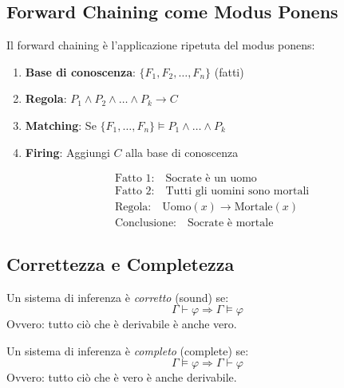 \subsection{Forward Chaining come Modus Ponens}

Il forward chaining è l'applicazione ripetuta del modus ponens:

\begin{enumerate}
\item \textbf{Base di conoscenza}: $\{F_1, F_2, \ldots, F_n\}$ (fatti)
\item \textbf{Regola}: $P_1 \land P_2 \land \ldots \land P_k \rightarrow C$
\item \textbf{Matching}: Se $\{F_1, \ldots, F_n\} \models P_1 \land \ldots \land P_k$
\item \textbf{Firing}: Aggiungi $C$ alla base di conoscenza
\end{enumerate}

\begin{esempio}
\begin{align*}
&\text{Fatto 1:} \quad \text{Socrate è un uomo} \\
&\text{Fatto 2:} \quad \text{Tutti gli uomini sono mortali} \\
&\text{Regola:} \quad \text{Uomo}(x) \rightarrow \text{Mortale}(x) \\
&\text{Conclusione:} \quad \text{Socrate è mortale}
\end{align*}
\end{esempio}

\subsection{Correttezza e Completezza}

\begin{definizione}[Correttezza]
Un sistema di inferenza è \textit{corretto} (sound) se:
\begin{equation}
\Gamma \vdash \varphi \Rightarrow \Gamma \models \varphi
\end{equation}
Ovvero: tutto ciò che è derivabile è anche vero.
\end{definizione}

\begin{definizione}[Completezza]
Un sistema di inferenza è \textit{completo} (complete) se:
\begin{equation}
\Gamma \models \varphi \Rightarrow \Gamma \vdash \varphi
\end{equation}
Ovvero: tutto ciò che è vero è anche derivabile.
\end{definizione}

